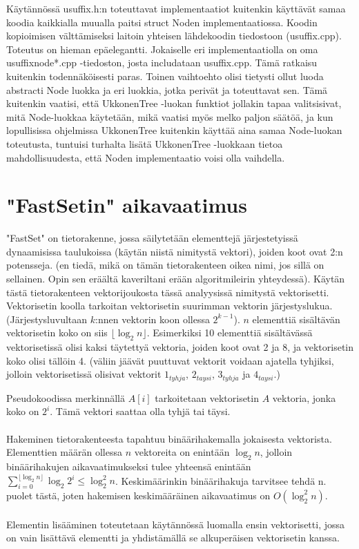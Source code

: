 \documentclass{article}
\begin{document}
        Käytännössä usuffix.h:n toteuttavat implementaatiot kuitenkin käyttävät samaa koodia kaikkialla muualla paitsi
        struct Noden implementaatiossa. Koodin kopioimisen välttämiseksi laitoin yhteisen lähdekoodin tiedostoon (usuffix.cpp).
        Toteutus on hieman epäelegantti. Jokaiselle eri implementaatiolla on oma usuffixnode*.cpp -tiedoston, josta 
        includataan usuffix.cpp. Tämä ratkaisu kuitenkin todennäköisesti paras. Toinen vaihtoehto olisi tietysti ollut
        luoda abstracti Node luokka ja eri luokkia, jotka perivät ja toteuttavat sen. Tämä kuitenkin vaatisi, että
        UkkonenTree -luokan funktiot jollakin tapaa valitsisivat, mitä Node-luokkaa käytetään, mikä vaatisi myös melko
        paljon säätöä, ja kun lopullisissa ohjelmissa UkkonenTree kuitenkin käyttää aina samaa Node-luokan toteutusta,
        tuntuisi turhalta lisätä UkkonenTree -luokkaan tietoa mahdollisuudesta, että Noden implementaatio voisi olla 
        vaihdella.
        
  \newpage
  \section{"FastSetin" aikavaatimus}

    "FastSet" on tietorakenne, jossa säilytetään elementtejä järjestetyissä dynaamisissa taulukoissa (käytän niistä
    nimitystä vektori), joiden koot ovat 2:n potensseja. (en tiedä, mikä on tämän tietorakenteen oikea nimi, jos sillä 
    on sellainen. Opin sen eräältä kaveriltani erään algoritmileirin yhteydessä). Käytän tästä tietorakenteen vektorijoukosta
    tässä analyysissä nimitystä vektorisetti. Vektorisetin koolla tarkoitan vektorisetin suurimman vektorin järjestyslukua.
    (Järjestysluvultaan $k$:nnen vektorin koon ollessa $2^{k-1}$). $n$ elementtiä sisältävän vektorisetin koko on siis
    $\lfloor \log_2 n \rfloor$. Esimerkiksi 10 elementtiä sisältävässä vektorisetissä olisi kaksi täytettyä vektoria, joiden 
    koot ovat 2 ja 8, ja vektorisetin koko olisi tällöin 4. (väliin jäävät puuttuvat vektorit voidaan ajatella tyhjiksi, 
    jolloin vektorisetissä olisivat vektorit $1_{tyhja}$, $2_{taysi}$, $3_{tyhja}$ ja $4_{taysi}$.)
    
    Pseudokoodissa merkinnällä $A[i]$ tarkoitetaan vektorisetin $A$ vektoria, jonka koko on $2^i$. Tämä vektori saattaa
    olla tyhjä tai täysi.
    \\ \\
    Hakeminen tietorakenteesta tapahtuu binäärihakemalla jokaisesta vektorista. Elementtien määrän ollessa $n$ vektoreita on 
    enintään $\log_2n$, jolloin binäärihakujen aikavaatimukseksi tulee yhteensä enintään $\sum_{i=0}^{\lfloor \log_2n \rfloor}
    {\log_2{2^i}}\leq \log_2^2 n$. Keskimäärinkin binäärihakuja tarvitsee tehdä n. puolet tästä, joten hakemisen keskimääräinen
    aikavaatimus on $O(\log_2^2 n)$.
    \\ \\
    Elementin lisääminen toteutetaan käytännössä luomalla ensin vektorisetti, jossa on vain lisättävä elementti ja yhdistämällä 
    se alkuperäisen vektorisetin kanssa.
    
\end{document}
